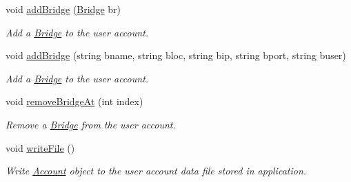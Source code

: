 \begin{DoxyCompactItemize}
\item 
void \hyperlink{classAccount_ac15cacc5ee4a7fdc3a397af0af0735a2}{add\+Bridge} (\hyperlink{classBridge}{Bridge} br)
\begin{DoxyCompactList}\small\item\em Add a \hyperlink{classBridge}{Bridge} to the user account. \end{DoxyCompactList}\item 
void \hyperlink{classAccount_a7dc637a4aa1f5711d1177a1c275aee68}{add\+Bridge} (string bname, string bloc, string bip, string bport, string buser)
\begin{DoxyCompactList}\small\item\em Add a \hyperlink{classBridge}{Bridge} to the user account. \end{DoxyCompactList}\item 
void \hyperlink{classAccount_ae1cbf1a3aaa6d6e41081664961c184d2}{remove\+Bridge\+At} (int index)
\begin{DoxyCompactList}\small\item\em Remove a \hyperlink{classBridge}{Bridge} from the user account. \end{DoxyCompactList}\item 
void \hyperlink{classAccount_ab0a3286b4529e632c1cdd35f9059a113}{write\+File} ()
\begin{DoxyCompactList}\small\item\em Write \hyperlink{classAccount}{Account} object to the user account data file stored in application. \end{DoxyCompactList}\end{DoxyCompactItemize}
